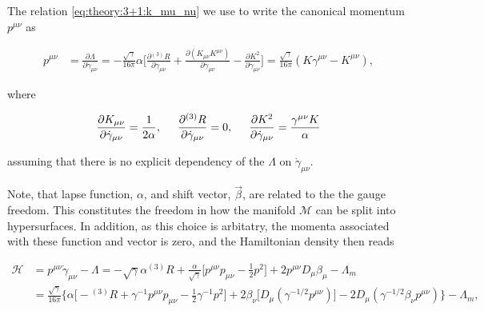 \documentclass[11pt,a4paper,headinclude=true,DIV=14,BCOR=8mm,chapterprefix,listof=totoc,twoside,openright,abstracton]{scrbook}
\begin{document}
The relation \ref{eq:theory:3+1:k_mu_nu} we use to write the canonical momentum $p^{\mu\nu}$ as

\begin{align}
p^{\mu\nu} &= \frac{\partial\Lambda}{\partial\dot{\gamma}_{\mu\nu}} 
= -\frac{\sqrt{\gamma}}{16\pi}\alpha\Bigg[\frac{\partial {^{(3)}R}}{\partial\dot{\gamma}_{\mu\nu}} + \frac{\partial(K_{\mu\nu}K^{\mu\nu})}{\partial\dot{\gamma}_{\mu\nu}} - \frac{\partial K^2}{\partial\dot{\gamma}_{\mu\nu}}\Bigg] 
= \frac{\sqrt{\gamma}}{16\pi}(K\gamma^{\mu\nu} - K^{\mu\nu}),
\end{align}

where 

\begin{equation}
\frac{\partial K_{\mu\nu}}{\partial \dot{\gamma}_{\mu\nu}} = \frac{1}{2\alpha}, \hspace{5mm} \frac{\partial {^{(3)}R}}{\partial \dot{\gamma}_{\mu\nu}} = 0, \hspace{5mm}\frac{\partial K^2}{\partial \dot{\gamma}_{\mu\nu}} = \frac{\gamma^{\mu\nu}K}{\alpha}
\end{equation}

assuming that there is no explicit dependency of the $\Lambda$ on $\dot{\gamma}_{\mu\nu}$.

Note, that lapse function, $\alpha$, and shift vector, $\vec{\beta}$, are related to the the gauge freedom. This constitutes the freedom in how the manifold $\mathcal{M}$ can be split into hypersurfaces. In addition, as this choice is arbitatry, the momenta associated with these function and vector is zero, and the Hamiltonian density then reads

\begin{align}
\mathcal{H} &= p^{\mu\nu}\dot{\gamma}_{\mu\nu} - \Lambda = -\sqrt{\gamma}\alpha{^{(3)}R} + \frac{\alpha}{\sqrt{\gamma}}\Big[p^{\mu\nu}p_{\mu\nu}-\frac{1}{2}p^2\Big] + 2p^{\mu\nu} D_{\mu}\beta_{\mu} -\Lambda_m \\
&= \frac{\sqrt{\gamma}}{16\pi}\Bigg\{\alpha\Big[ -{^{(3)}R} + \gamma^{-1}p^{\mu\nu}p_{\mu\nu}-\frac{1}{2}\gamma^{-1}p^2\Big] +  2\beta_{\nu}\Big[D_{\mu}(\gamma^{-1/2}p^{\mu\nu})\Big] - 2D_{\mu}(\gamma^{-1/2}\beta_{\nu}p^{\mu\nu}) \Bigg\} - \Lambda_m,
\end{align}
\end{document}
